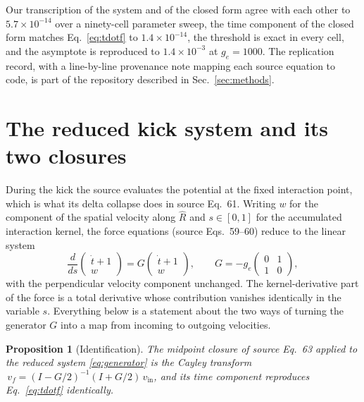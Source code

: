 \documentclass[aps,prd,reprint,nofootinbib]{revtex4-2}
\newtheorem{proposition}{Proposition}
\begin{document}
Our transcription of the system and of the closed form agree with each
other to $5.7 \times 10^{-14}$ over a ninety-cell parameter sweep, the
time component of the closed form matches Eq.~\eqref{eq:tdotf} to
$1.4 \times 10^{-14}$, the threshold is exact in every cell, and the
asymptote is reproduced to $1.4 \times 10^{-3}$ at $g_{e} = 1000$.  The
replication record, with a line-by-line provenance note mapping each
source equation to code, is part of the repository described in
Sec.~\ref{sec:methods}.

\section{The reduced kick system and its two closures}
\label{sec:reduced}

During the kick the source evaluates the potential at the fixed
interaction point, which is what its delta collapse does in source
Eq.~61.  Writing $w$ for the component of the spatial velocity along
$\hat R$ and $s \in [0, 1]$ for the accumulated interaction kernel, the
force equations (source Eqs.~59--60) reduce to the linear system
\begin{equation}
\frac{d}{ds}
\begin{pmatrix} \dot t + 1 \\ w \end{pmatrix}
=
G
\begin{pmatrix} \dot t + 1 \\ w \end{pmatrix},
\qquad
G = -g_{e}
\begin{pmatrix} 0 & 1 \\ 1 & 0 \end{pmatrix},
\label{eq:generator}
\end{equation}
with the perpendicular velocity component unchanged.  The
kernel-derivative part of the force is a total derivative whose
contribution vanishes identically in the variable $s$.  Everything below
is a statement about the two ways of turning the generator
$G$ into a map from incoming to outgoing velocities.

\begin{proposition}[Identification]
\label{prop:cayley}
The midpoint closure of source Eq.~63 applied to the reduced system
\eqref{eq:generator} is the Cayley transform
$\,v_{f} = (I - G/2)^{-1}(I + G/2)\, v_{\mathrm{in}}$, and its time
component reproduces Eq.~\eqref{eq:tdotf} identically.
\end{proposition}
\end{document}
